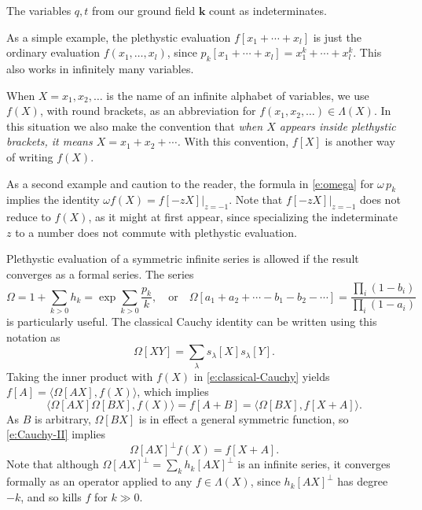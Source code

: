 \documentclass[12pt]{amsart}
\theoremstyle{definition}
\theoremstyle{remark}
\newcommand{\kk}{{\mathbf k}}
\begin{document}
The variables $q, t$ from our ground field $\kk $ count as
indeterminates.

As a simple example, the plethystic evaluation $f[x_{1}+\cdots
+x_{l}]$ is just the ordinary evaluation $f(x_{1},\ldots,x_{l})$,
since $p_{k}[x_{1}+\cdots +x_{l}] = x_{1}^{k}+\cdots +x_{l}^{k}$.
This also works in infinitely many variables.

When $X = x_{1},x_{2},\ldots$ is the name of an infinite alphabet of
variables, we use $f(X)$, with round brackets, as an abbreviation for
$f(x_{1},x_{2},\ldots)\in \Lambda (X)$.  In this situation we also
make the convention that {\em when $X$ appears inside plethystic
brackets, it means $X = x_{1}+x_{2}+\cdots $.}  With this convention,
$f[X]$ is another way of writing $f(X)$.  

As a second example and caution to the reader, the formula in
\eqref{e:omega} for $\omega \, p_{k}$ implies the identity $\omega
f(X) = f[-z X]|_{z=-1}$.  Note that $f[-z X]|_{z=-1}$ does not reduce
to $f(X)$, as it might at first appear, since specializing the
indeterminate $z$ to a number does not commute with plethystic
evaluation.

Plethystic evaluation of a symmetric infinite series is allowed if the
result converges as a formal series.  The series
\begin{equation}\label{e:Omega}
\Omega = 1 + \sum _{k>0} h_{k} = \exp \sum _{k>0} \frac{p_{k}}{k},
\quad \text{or}\quad \Omega [a_{1}+a_{2}+\cdots -b_{1}-b_{2}-\cdots ]
= \frac{\prod_{i} (1-b_{i})}{\prod_{i} (1-a_{i})}
\end{equation}
is particularly useful.  The classical Cauchy identity can be written
using this notation as
\begin{equation}\label{e:classical-Cauchy}
\Omega [XY] = \sum _{\lambda }s_{\lambda }[X]s_{\lambda }[Y].
\end{equation}
Taking the inner product with $f(X)$ in \eqref{e:classical-Cauchy}
yields $f[A] = \langle \Omega [AX], f(X) \rangle$, which implies
\begin{equation}\label{e:Cauchy-II}
\langle \Omega [AX]\Omega [BX],f(X) \rangle = f[A+B] = \langle \Omega
[BX],f[X+A] \rangle.
\end{equation}
As $B$ is arbitrary, $\Omega [BX]$ is in effect a general symmetric
function, so \eqref{e:Cauchy-II} implies
\begin{equation}\label{e:Omega-perp}
\Omega [AX]^{\perp }f(X) = f[X+A].
\end{equation}
Note that although $\Omega [AX]^{\perp } = \sum _{k} h_{k}[AX]^{\perp
}$ is an infinite series, it converges formally as an operator applied
to any $f\in \Lambda (X)$, since $h_{k}[AX]^{\perp }$ has degree $-k$,
and so kills $f$ for $k \gg 0$.
\end{document}
